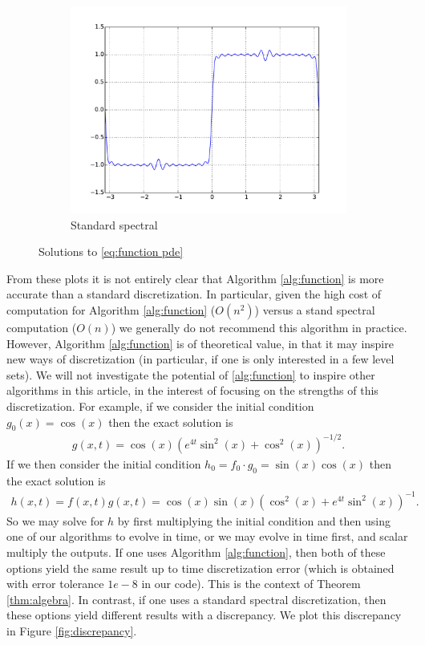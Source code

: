 \documentclass[final,leqno]{siamltex1213}
\begin{document}
\begin{figure}[h]
\begin{subfigure}{0.3\textwidth}
		\includegraphics[width=\textwidth]{./images/function_plots/Koopman_1.pdf}
		\caption{Standard spectral}
		\label{fig:standard function 1}
	\end{subfigure}
	\caption{Solutions to \eqref{eq:function pde}}
	\label{fig:function}
\end{figure}

From these plots it is not entirely clear that Algorithm \ref{alg:function} is more accurate than a standard discretization.
In particular, given the high cost of computation for Algorithm \ref{alg:function}  ($O(n^{2})$) versus a stand spectral computation ($O(n)$) we generally do not recommend this algorithm in practice.
However, Algorithm \ref{alg:function} is of theoretical value, in that it may inspire new ways of discretization (in particular, if one is only interested in a few level sets).
We will not investigate the potential of \ref{alg:function} to inspire other algorithms in this article,
in the interest of focusing on the strengths of this discretization.
For example, if we consider the initial condition $g_{0}(x) = \cos(x)$ then the exact solution is
\begin{align*}
	g(x,t) =   \cos(x) \left( e^{4t} \sin^{2}(x) + \cos^{2}(x) \right)^{-1/2}.
\end{align*}
If we then consider the initial condition $h_{0} = f_{0} \cdot g_{0}  = \sin(x) \cos(x)$
then the exact solution is
\begin{align*}
	h(x,t) = f(x,t) g(x,t) = \cos(x) \sin(x) \left( \cos^{2}(x) + e^{4t} \sin^{2}(x) \right)^{-1}.
\end{align*}
So we may solve for $h$ by first multiplying the initial condition and then using one of our algorithms to evolve in time, 
or we may evolve in time first, and scalar multiply the outputs.
If one uses Algorithm \ref{alg:function}, then both of these options yield the same result up to time discretization error (which is obtained with error tolerance $1e-8$ in our code).
This is the context of Theorem \ref{thm:algebra}.
In contrast, if one uses a standard spectral discretization, then these options yield different results with a discrepancy.
We plot this discrepancy in Figure \ref{fig:discrepancy}.
\end{document}
